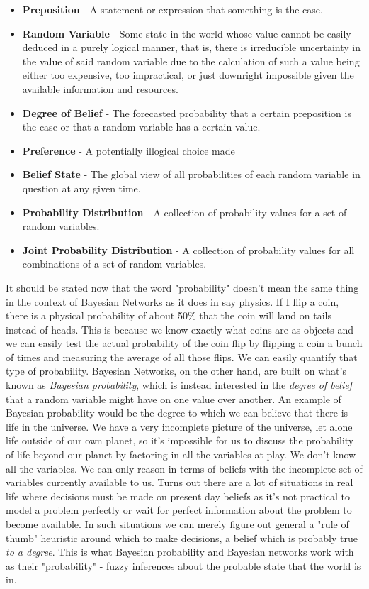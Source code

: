 \documentclass[a4paper,12pt]{article}
\begin{document}
\begin{itemize}
  \item \textbf{Preposition} - A statement or expression that something is the case.
  \item \textbf{Random Variable} - Some state in the world whose value cannot be easily deduced in a purely logical manner, that is, there is irreducible uncertainty in the value of said random variable due to the calculation of such a value being either too expensive, too impractical, or just downright impossible given the available information and resources.
  \item \textbf{Degree of Belief} - The forecasted probability that a certain preposition is the case or that a random variable has a certain value.
  \item \textbf{Preference} - A potentially illogical choice made 
  \item \textbf{Belief State} - The global view of all probabilities of each random variable in question at any given time.
  \item \textbf{Probability Distribution} - A collection of probability values for a set of random variables.
  \item \textbf{Joint Probability Distribution} - A collection of probability values for all combinations of a set of random variables.
\end{itemize}

  It should be stated now that the word "probability" doesn't mean the same thing in the context of Bayesian Networks as it does in say physics. If I flip a coin, there is a physical probability of about 50\% that the coin will land on tails instead of heads. This is because we know exactly what coins are as objects and we can easily test the actual probability of the coin flip by flipping a coin a bunch of times and measuring the average of all those flips. We can easily quantify that type of probability. Bayesian Networks, on the other hand, are built on what's known as \emph{Bayesian probability}, which is instead interested in the \emph{degree of belief} that a random variable might have on one value over another. An example of Bayesian probability would be the degree to which we can believe that there is life in the universe. We have a very incomplete picture of the universe, let alone life outside of our own planet, so it's impossible for us to discuss the probability of life beyond our planet by factoring in all the variables at play. We don't know all the variables. We can only reason in terms of beliefs with the incomplete set of variables currently available to us. Turns out there are a lot of situations in real life where decisions must be made on present day beliefs as it's not practical to model a problem perfectly or wait for perfect information about the problem to become available. In such situations we can merely figure out general a "rule of thumb" heuristic around which to make decisions, a belief which is probably true \emph{to a degree}. This is what Bayesian probability and Bayesian networks work with as their "probability" - fuzzy inferences about the probable state that the world is in.
\end{document}
